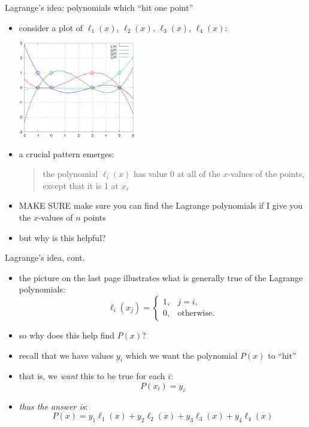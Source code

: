\documentclass[10pt,hyperref]{beamer}
\newcommand{\MS}{\alert{MAKE SURE}\xspace}
\begin{document}
\begin{frame}{Lagrange's idea: polynomials which ``hit one point''}

\begin{itemize}
\item consider a plot of $\ell_1(x)$, $\ell_2(x)$, $\ell_3(x)$, $\ell_4(x)$:
  \begin{center}
  \includegraphics[width=0.4\textwidth]{lagrange4}
  \end{center}
\item a crucial pattern emerges:
\begin{quote}
the polynomial $\ell_i(x)$ has value 0 at all of the $x$-values of the points, except that it is 1 at $x_i$
\end{quote}
\item \MS make sure you can find the Lagrange polynomials if I give you the $x$-values of $n$ points
\item but why is this helpful?
\end{itemize}
\end{frame}


\begin{frame}{Lagrange's idea, cont.}

\begin{itemize}
\item the picture on the last page illustrates what is generally true of the Lagrange polynomials:
	$$\ell_i(x_j) = \begin{cases}
   	                 1, & j = i, \\
   	                 0, & \text{otherwise}.
	                \end{cases}$$
\item so why does this help find $P(x)$?
\item recall that we have values $y_i$ which we want the polynomial $P(x)$ to ``hit''
\item that is, we \emph{want} this to be true for each $i$:
	$$P(x_i) = y_i$$
\item \emph{thus the answer is}:
	$$P(x) = y_1 \ell_1(x) + y_2 \ell_2(x) + y_3 \ell_3(x) + y_4 \ell_4(x)$$
\end{itemize}
\end{frame}
\end{document}
